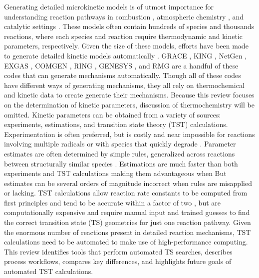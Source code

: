 \documentclass[preprint, 11pt]{elsarticle} %
\begin{document}
Generating detailed microkinetic models is of utmost importance for understanding reaction pathways in combustion \cite{VandeVijver:2015}, atmospheric chemistry \cite{Vereecken:2012}, and catalytic settings \cite{STOLTZE:2000}.
These models often contain hundreds of species and thousands reactions, where each species and reaction require thermodynamic and kinetic parameters, respectively.
Given the size of these models, efforts have been made to generate detailed kinetic models automatically \cite{vandevijver:2015}. 
GRACE \cite{yoneda:1979}, KING \cite{maio:1992}, NetGen \cite{susnow:1997}, EXGAS \cite{warth:2000}, COMGEN \cite{ratkiewicz:2003}, RING \cite{rangarajan:2012}, GENESYS \cite{vandewiele:2012}, and RMG \cite{gao:2016} are a handful of these codes that can generate mechanisms automatically.
Though all of these codes have different ways of generating mechanisms, they all rely on thermochemical and kinetic data to create generate their mechanisms. 
Because this review focuses on the determination of kinetic parameters, discussion of thermochemistry will be omitted.
Kinetic parameters can be obtained from a variety of sources: experiments, estimations, and transition state theory (TST) calculations.
Experimentation is often preferred, but is costly and near impossible for reactions involving multiple radicals or with species that quickly degrade \cite{Sabbe:2005}.
Parameter estimates are often determined by simple rules, generalized across reactions between structurally similar species \cite{Curran:1998bx, cai:2014}. 
Estimations are much faster than both experiments and TST calculations making them advantageous when 
But estimates can be several orders of magnitude incorrect when rules are misapplied or lacking.
TST calculations allow reaction rate constants to be computed from first principles and tend to be accurate within a factor of two \cite{fernandez:2006, Klippenstein:2017eu}, but are computationally expensive and require manual input and trained guesses to find the correct transition state (TS) geometries for just one reaction pathway. 
Given the enormous number of reactions present in detailed reaction mechanisms, TST calculations need to be automated to make use of high-performance computing.
This review identifies tools that perform automated TS searches, describes process workflows, compares key differences, and highlights future goals of automated TST calculations.
\end{document}
